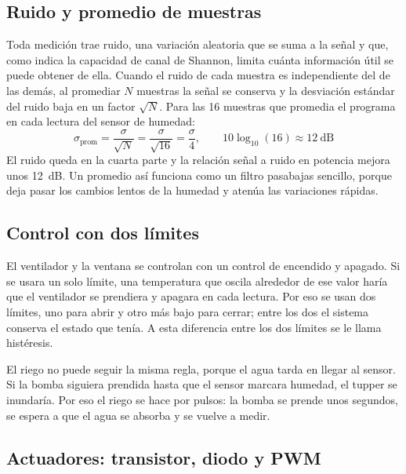 \documentclass[12pt, letterpaper]{article}
\begin{document}
\subsection{Ruido y promedio de muestras}

Toda medición trae ruido, una variación aleatoria que se suma a la señal y que, como indica la capacidad de canal de
Shannon, limita cuánta información útil se puede obtener de ella. Cuando el ruido de cada muestra es independiente del
de las demás, al promediar $N$ muestras la señal se conserva y la desviación estándar del ruido baja en un factor
$\sqrt{N}$. Para las 16 muestras que promedia el programa en cada lectura del sensor de humedad:
\[
\sigma_{\text{prom}} = \frac{\sigma}{\sqrt{N}} = \frac{\sigma}{\sqrt{16}} = \frac{\sigma}{4},
\qquad 10\log_{10}(16) \approx 12\ \text{dB}
\]
El ruido queda en la cuarta parte y la relación señal a ruido en potencia mejora unos 12~dB. Un promedio así funciona
como un filtro pasabajas sencillo, porque deja pasar los cambios lentos de la humedad y atenúa las variaciones rápidas.

\subsection{Control con dos límites}

El ventilador y la ventana se controlan con un control de encendido y apagado. Si se usara un solo límite, una
temperatura que oscila alrededor de ese valor haría que el ventilador se prendiera y apagara en cada lectura. Por eso
se usan dos límites, uno para abrir y otro más bajo para cerrar; entre los dos el sistema conserva el estado que tenía.
A esta diferencia entre los dos límites se le llama histéresis.

El riego no puede seguir la misma regla, porque el agua tarda en llegar al sensor. Si la bomba siguiera prendida hasta
que el sensor marcara humedad, el tupper se inundaría. Por eso el riego se hace por pulsos: la bomba se prende unos
segundos, se espera a que el agua se absorba y se vuelve a medir.

\subsection{Actuadores: transistor, diodo y PWM}
\end{document}

